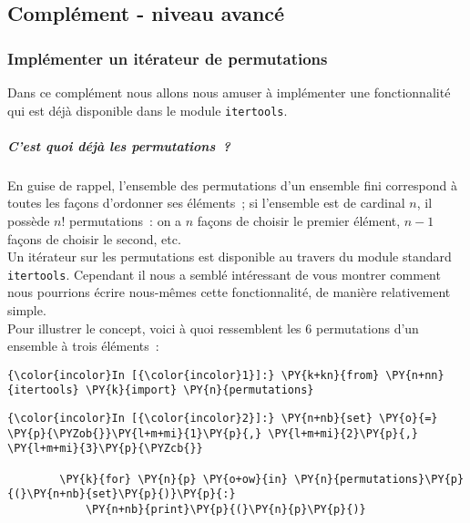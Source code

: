     \hypertarget{compluxe9ment---niveau-avancuxe9}{%
\subsection{Complément - niveau
avancé}\label{compluxe9ment---niveau-avancuxe9}}

    \hypertarget{impluxe9menter-un-ituxe9rateur-de-permutations}{%
\subsubsection{Implémenter un itérateur de
permutations}\label{impluxe9menter-un-ituxe9rateur-de-permutations}}

    Dans ce complément nous allons nous amuser à implémenter une
fonctionnalité qui est déjà disponible dans le module
\texttt{itertools}.

    \hypertarget{cest-quoi-duxe9juxe0-les-permutations}{%
\subparagraph{C'est quoi déjà les
permutations~?}\label{cest-quoi-duxe9juxe0-les-permutations}}

    En guise de rappel, l'ensemble des permutations d'un ensemble fini
correspond à toutes les façons d'ordonner ses éléments~; si l'ensemble
est de cardinal \(n\), il possède \(n!\) permutations~: on a \(n\)
façons de choisir le premier élément, \(n-1\) façons de choisir le
second, etc.\\

    Un itérateur sur les permutations est disponible au travers du module
standard \texttt{itertools}. Cependant il nous a semblé intéressant de
vous montrer comment nous pourrions écrire nous-mêmes cette
fonctionnalité, de manière relativement simple.\\

    Pour illustrer le concept, voici à quoi ressemblent les 6 permutations
d'un ensemble à trois éléments~:

    \begin{Verbatim}[commandchars=\\\{\}]
{\color{incolor}In [{\color{incolor}1}]:} \PY{k+kn}{from} \PY{n+nn}{itertools} \PY{k}{import} \PY{n}{permutations}
\end{Verbatim}


    \begin{Verbatim}[commandchars=\\\{\}]
{\color{incolor}In [{\color{incolor}2}]:} \PY{n+nb}{set} \PY{o}{=} \PY{p}{\PYZob{}}\PY{l+m+mi}{1}\PY{p}{,} \PY{l+m+mi}{2}\PY{p}{,} \PY{l+m+mi}{3}\PY{p}{\PYZcb{}}
        
        \PY{k}{for} \PY{n}{p} \PY{o+ow}{in} \PY{n}{permutations}\PY{p}{(}\PY{n+nb}{set}\PY{p}{)}\PY{p}{:}
            \PY{n+nb}{print}\PY{p}{(}\PY{n}{p}\PY{p}{)}
\end{Verbatim}


